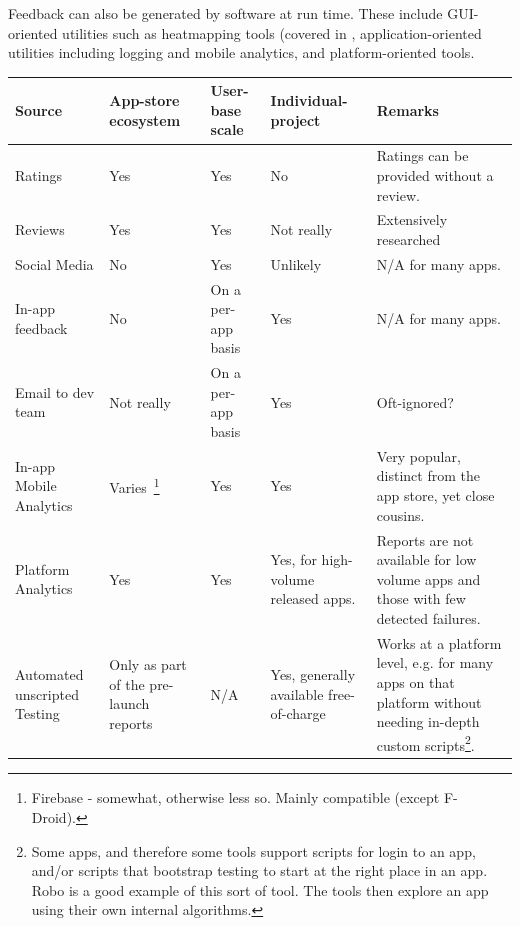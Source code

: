 Feedback can also be generated by software at run time. These include GUI-oriented utilities such as heatmapping tools (covered in , application-oriented utilities including logging and mobile analytics, and platform-oriented tools.



\begin{table}[H]
	\setlength\tabcolsep{0.4em} %
	\def\arraystretch{1}%
	\scriptsize %
	\begin{tabular}{L{2cm} L{2.4cm} L{3.5cm} L{2.4cm} L{3.5cm}} %
		\toprule
		\textbf{Source} & \textbf{App-store ecosystem} & \textbf{User-base scale} & \textbf{Individual-project} & \textbf{Remarks} \\ \midrule
		Ratings & Yes & Yes & No & Ratings can be provided without a review. \\ \midrule
		Reviews & Yes & Yes & Not really & Extensively researched \\ \midrule
		Social Media & No & Yes & Unlikely & N/A for many apps. \\ \midrule
		In-app feedback & No & On a per-app basis & Yes & N/A for many apps. \\ \midrule
		Email to dev team & Not really & On a per-app basis & Yes & Oft-ignored? \\ \midrule
		In-app Mobile Analytics & Varies~\footnote{Firebase - somewhat, otherwise less so. Mainly compatible (except F-Droid).} & Yes & Yes & Very popular, distinct from the app store, yet close cousins. \\ \midrule
		Platform Analytics & Yes & Yes & Yes, for high-volume released apps. & Reports are not available for low volume apps and those with few detected failures.  \\ \midrule
		Automated unscripted Testing & Only as part of the pre-launch reports & N/A & Yes, generally available free-of-charge & Works at a platform level, e.g. for many apps on that platform without needing in-depth custom scripts\footnote{ Some apps, and therefore some tools support scripts for login to an app, and/or scripts that bootstrap testing to start at the right place in an app. Robo is a good example of this sort of tool. The tools then explore an app using their own internal algorithms.}. \\ \midrule

\end{tabular}
\end{table}
